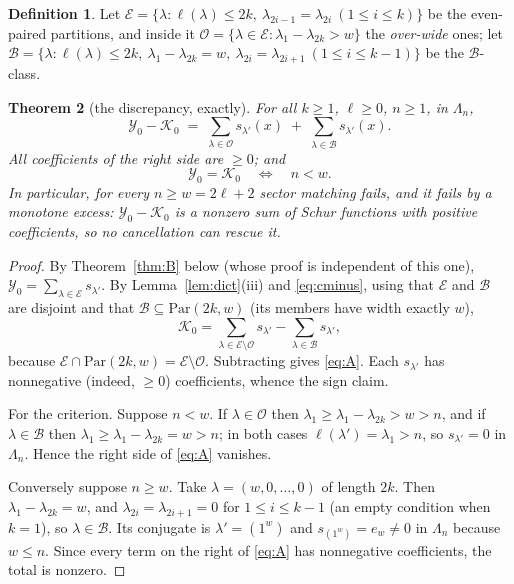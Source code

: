 \documentclass[11pt]{article}
\theoremstyle{plain}
\newtheorem{theorem}{Theorem}
\theoremstyle{definition}
\newtheorem{definition}[theorem]{Definition}
\newcommand{\Par}{\mathrm{Par}}
\newcommand{\Lam}{\Lambda_n}
\begin{document}
\begin{definition}\label{def:classes}
Let $\mathcal E=\{\lambda:\ell(\lambda)\le2k,\ \lambda_{2i-1}=\lambda_{2i}\ (1\le i\le k)\}$
be the even-paired partitions, and inside it
$\mathcal O=\{\lambda\in\mathcal E:\lambda_1-\lambda_{2k}>w\}$ the \emph{over-wide} ones;
let $\mathcal B=\{\lambda:\ell(\lambda)\le2k,\ \lambda_1-\lambda_{2k}=w,\
\lambda_{2i}=\lambda_{2i+1}\ (1\le i\le k-1)\}$ be the $\mathcal B$-class.
\end{definition}

\begin{theorem}[the discrepancy, exactly]\label{thm:A}
For all $k\ge1$, $\ell\ge0$, $n\ge1$, in $\Lam$,
\begin{equation}\label{eq:A}
  \mathcal Y_0-\mathcal K_0\;=\;\sum_{\lambda\in\mathcal O}s_{\lambda'}(x)
   \;+\;\sum_{\lambda\in\mathcal B}s_{\lambda'}(x).
\end{equation}
All coefficients of the right side are $\ge0$; and
\[
  \mathcal Y_0=\mathcal K_0 \quad\Longleftrightarrow\quad n<w .
\]
In particular, for every $n\ge w=2\ell+2$ sector matching fails, and it fails by a
\emph{monotone excess}: $\mathcal Y_0-\mathcal K_0$ is a nonzero sum of Schur functions
with positive coefficients, so no cancellation can rescue it.
\end{theorem}

\begin{proof}
By Theorem~\ref{thm:B} below (whose proof is independent of this one),
$\mathcal Y_0=\sum_{\lambda\in\mathcal E}s_{\lambda'}$.  By Lemma~\ref{lem:dict}(iii) and
\eqref{eq:cminus}, using that $\mathcal E$ and $\mathcal B$ are disjoint and that
$\mathcal B\subseteq\Par(2k,w)$ (its members have width exactly $w$),
\[
  \mathcal K_0=\sum_{\lambda\in\mathcal E\setminus\mathcal O}s_{\lambda'}
              -\sum_{\lambda\in\mathcal B}s_{\lambda'},
\]
because $\mathcal E\cap\Par(2k,w)=\mathcal E\setminus\mathcal O$.  Subtracting gives
\eqref{eq:A}.  Each $s_{\lambda'}$ has nonnegative (indeed, $\ge0$) coefficients, whence
the sign claim.

For the criterion.  Suppose $n<w$.  If $\lambda\in\mathcal O$ then
$\lambda_1\ge\lambda_1-\lambda_{2k}>w>n$, and if $\lambda\in\mathcal B$ then
$\lambda_1\ge\lambda_1-\lambda_{2k}=w>n$; in both cases $\ell(\lambda')=\lambda_1>n$, so
$s_{\lambda'}=0$ in $\Lam$.  Hence the right side of \eqref{eq:A} vanishes.

Conversely suppose $n\ge w$.  Take $\lambda=(w,0,\dots,0)$ of length $2k$.  Then
$\lambda_1-\lambda_{2k}=w$, and $\lambda_{2i}=\lambda_{2i+1}=0$ for $1\le i\le k-1$ (an
empty condition when $k=1$), so $\lambda\in\mathcal B$.  Its conjugate is $\lambda'=(1^w)$
and $s_{(1^w)}=e_w\ne0$ in $\Lam$ because $w\le n$.  Since every term on the right of
\eqref{eq:A} has nonnegative coefficients, the total is nonzero.
\end{proof}
\end{document}
